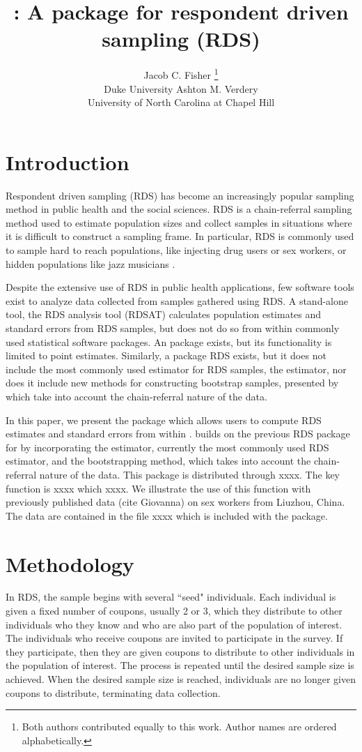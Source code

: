 \documentclass[article, shortnames]{jss}
\author{Jacob C. Fisher
        \thanks{Both authors contributed equally to this work.  Author names are ordered alphabetically.}
	       \\Duke University \And 
        Ashton M. Verdery\\University of North Carolina at Chapel Hill
								}
\title{\pkg{RDS2}: A \proglang{Stata} package for respondent driven sampling (RDS)}
\begin{document}

\section[Introduction]{Introduction}
Respondent driven sampling (RDS) has become an increasingly popular sampling method in public health and the social sciences. RDS is a chain-referral sampling method used to estimate population sizes and collect samples in situations where it is difficult to construct a sampling frame.  In particular, RDS is commonly used to sample hard to reach populations, like injecting drug users or sex workers, or hidden populations like jazz musicians \citep{heckathorn97}.

Despite the extensive use of RDS in public health applications, few software tools exist to analyze data collected from samples gathered using RDS.  A stand-alone tool, the RDS analysis tool (RDSAT) \citep{rdsat} calculates population estimates and standard errors from RDS samples, but does not do so from within commonly used statistical software packages.  An  package  \citep{r-rds} exists, but its functionality is limited to point estimates.  Similarly, a  package RDS \citep{stata-rds} exists, but it does not include the most commonly used estimator for RDS samples, the \citet{vh2004} estimator, nor does it include new methods for constructing bootstrap samples, presented by \citet{salganik2006} which take into account the chain-referral nature of the data.

In this paper, we present the  package  which allows users to compute RDS estimates and standard errors from within .   builds on the previous RDS package for  by incorporating the \citet{vh2004} estimator, currently the most commonly used RDS estimator, and the \citet{salganik2006} bootstrapping method, which takes into account the chain-referral nature of the data.  This package is distributed through xxxx.  The key function is xxxx which xxxx.  We illustrate the use of this function with previously published data (cite Giovanna) on sex workers from Liuzhou, China.  The data are contained in the file xxxx which is included with the  package.

\section[Methodology]{Methodology}
In RDS, the sample begins with several ``seed" individuals.  Each individual is given a fixed number of coupons, usually 2 or 3, which they distribute to other individuals who they know and who are also part of the population of interest.  The individuals who receive coupons are invited to participate in the survey.  If they participate, then they are given coupons to distribute to other individuals in the population of interest.  The process is repeated until the desired sample size is achieved.  When the desired sample size is reached, individuals are no longer given coupons to distribute, terminating data collection.   




\end{document}
